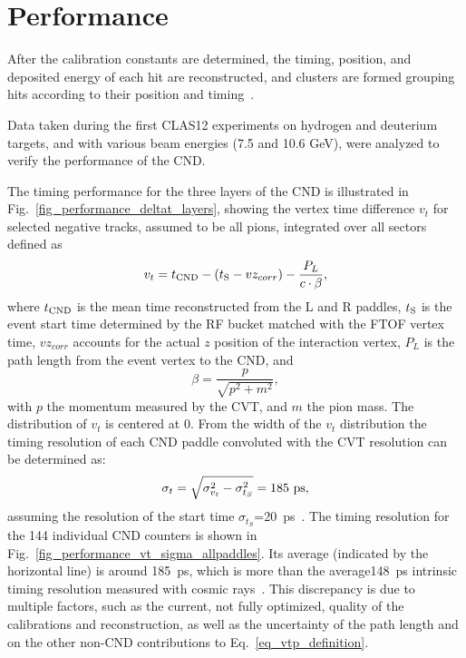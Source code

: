 \section{Performance}

After the calibration constants are determined, the timing, position, and deposited energy of each hit are reconstructed, and clusters are formed grouping hits according to their position and timing~\cite{recon-nim}.

Data taken during the first CLAS12 experiments on hydrogen and deuterium targets, and with various beam energies (7.5 and 10.6 GeV), were analyzed to verify the performance of the CND. 

The timing performance for the three layers of the CND is illustrated in Fig.~\ref{fig_performance_deltat_layers}, showing the vertex time difference $v_t$ for selected negative tracks, assumed to be all pions, integrated over all sectors defined as
\begin{equation}\label{eq_vtp_definition}
v_t=t_{\rm{CND}}-(t_{\rm{S}}-vz_{corr})-\frac{P_L}{c \cdot \beta} ,
\end{equation}
where $t_{\rm{CND}}$ is the mean time reconstructed from the L and R paddles, $t_{\rm{S}}$ is the event start time determined by the RF bucket matched with the FTOF vertex time, $vz_{corr}$ accounts for the actual $z$ position of the interaction vertex, $P_L$ is the path length from the event vertex to the CND, and
\begin{equation}\label{eq_beta_definition}
  \beta=\frac{p}{\sqrt{p^2+m^2}},
\end{equation}
with $p$ the momentum measured by the CVT, and $m$ the pion mass. 
The distribution of $v_t$ is centered at 0. From the width of the $v_t$ distribution the timing resolution of each CND paddle convoluted with the CVT resolution can be determined as:
\begin{equation}\label{eq_resolution}
\sigma_t=\sqrt{\sigma_{v_t}^2-\sigma_{t_{S}}^2} =185~\rm{ps}, 
\end{equation}
assuming the resolution of the start time $\sigma_{t_{S}}$=20~ps~\cite{ftof-nim}.
The timing resolution for the 144 individual CND counters is shown in Fig.~\ref{fig_performance_vt_sigma_allpaddles}. Its average (indicated by the horizontal line) is around 185~ps, which is more than the average148~ps  intrinsic timing resolution measured with cosmic rays~\cite{Niccolai:2018qzm}. This discrepancy is due to multiple factors, such as the current, not fully optimized, quality of the calibrations and reconstruction, as well as the uncertainty of the path length and on the other non-CND contributions to Eq.~\ref{eq_vtp_definition}.
